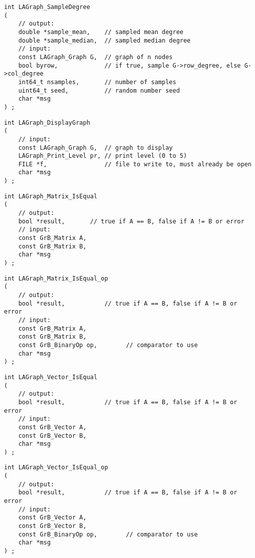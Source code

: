 \begin{verbatim}
int LAGraph_SampleDegree
(
    // output:
    double *sample_mean,    // sampled mean degree
    double *sample_median,  // sampled median degree
    // input:
    const LAGraph_Graph G,  // graph of n nodes
    bool byrow,             // if true, sample G->row_degree, else G->col_degree
    int64_t nsamples,       // number of samples
    uint64_t seed,          // random number seed
    char *msg
) ;
\end{verbatim}




\begin{verbatim}
int LAGraph_DisplayGraph
(
    // input:
    const LAGraph_Graph G,  // graph to display
    LAGraph_Print_Level pr, // print level (0 to 5)
    FILE *f,                // file to write to, must already be open
    char *msg
) ;
\end{verbatim}




\begin{verbatim}
int LAGraph_Matrix_IsEqual
(
    // output:
    bool *result,       // true if A == B, false if A != B or error
    // input:
    const GrB_Matrix A,
    const GrB_Matrix B,
    char *msg
) ;
\end{verbatim}




\begin{verbatim}
int LAGraph_Matrix_IsEqual_op
(
    // output:
    bool *result,           // true if A == B, false if A != B or error
    // input:
    const GrB_Matrix A,
    const GrB_Matrix B,
    const GrB_BinaryOp op,        // comparator to use
    char *msg
) ;
\end{verbatim}




\begin{verbatim}
int LAGraph_Vector_IsEqual
(
    // output:
    bool *result,           // true if A == B, false if A != B or error
    // input:
    const GrB_Vector A,
    const GrB_Vector B,
    char *msg
) ;
\end{verbatim}




\begin{verbatim}
int LAGraph_Vector_IsEqual_op
(
    // output:
    bool *result,           // true if A == B, false if A != B or error
    // input:
    const GrB_Vector A,
    const GrB_Vector B,
    const GrB_BinaryOp op,        // comparator to use
    char *msg
) ;
\end{verbatim}




